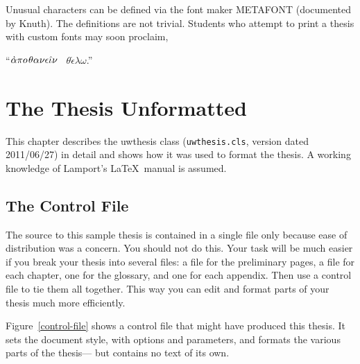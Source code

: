 \documentclass [11pt, twoside] {uwthesis}[2012/06/19]
\let\mffont=\sf
\begin{document}
Unusual characters can be defined via the
font maker \hbox{\mffont METAFONT} (documented by Knuth\cite{Metafont}).
The definitions are not trivial.
Students who attempt to print a thesis with
custom fonts may soon proclaim,
 
\medskip
\begin{center}
``$\mathaccent"7027\alpha\pi o\kern1pt\theta\alpha\nu\epsilon\hat\iota\nu$
\ $\theta\acute\epsilon\lambda\omega$.''
 
\end{center}
 
 
\chapter{The Thesis Unformatted}
 
This chapter describes the uwthesis class (\texttt{uwthesis.cls},
version dated 2011/06/27)
in detail 
and shows how it was used to format the thesis.
A working knowledge of Lamport's \LaTeX\ manual\cite{Lbook} is assumed.
 
\section{The Control File}
 
The source to this sample thesis is contained in a single file
only because ease of distribution was a concern.
You should not do this.  Your task will be much easier if you
break your thesis into several files:  a file for the preliminary pages,
a file for each chapter,  one for the glossary, and one for each
appendix.  Then use a control file to tie them all together.
This way you can edit and format parts of your thesis much more
efficiently.
 
Figure~\ref{control-file} shows a control file that
might have produced this thesis.
It sets the document style, with options and parameters,
and formats the various parts of the thesis---%
but contains no text of its own.
 
\end{document}
